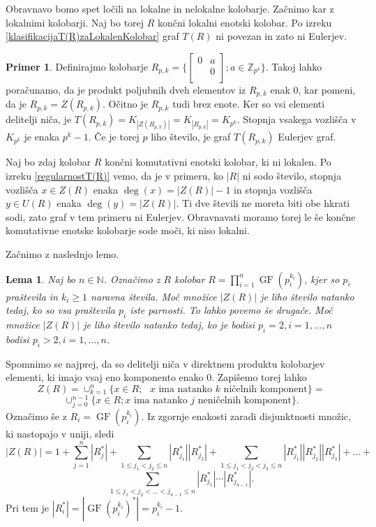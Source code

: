 \documentclass[a4paper, 12pt]{amsart}
\theoremstyle{definition} %
\newtheorem{primer}[definicija]{Primer}
\theoremstyle{plain} %
\newtheorem{lema}[definicija]{Lema}
\newcommand{\N}{\mathbb N}
\newcommand{\Z}{\mathbb Z}
\DeclareMathOperator{\GF}{GF}
\begin{document}
Obravnavo bomo spet ločili na lokalne in nelokalne kolobarje. Začnimo kar z lokalnimi kolobarji. Naj bo torej $R$ končni lokalni enotski kolobar. Po izreku  \ref{klasifikacijaT(R)zaLokalenKolobar} graf $T(R)$ ni povezan in zato ni Eulerjev. 

\begin{primer}
Definirajmo kolobarje $R_{p,k} = \big\{  
\begin{bmatrix}
0 & a \\
 & 0\\
\end{bmatrix};
a \in \Z_{p^k}
\big\}
$. 
Takoj lahko poračunamo, da je produkt poljubnih dveh elementov iz $R_{p,k}$ enak 0, kar pomeni, da je $R_{p,k} = Z(R_{p,k})$. Očitno je $R_{p,k}$ tudi brez enote. Ker so vsi elementi delitelji niča, je $T(R_{p,k}) = K_{|Z(R_{p,k})|} = K_{|R_{p,k}|} = K_{p^k}$. Stopnja vsakega vozlišča v $K_{p^k}$ je enaka $p^k -1$. Če je torej $p$ liho število, je graf $T(R_{p,k})$ Eulerjev graf.
\end{primer}

Naj bo zdaj kolobar $R$ končni komutativni enotski kolobar, ki ni lokalen. Po izreku  \ref{regularnostT(R)} vemo, da je v primeru, ko $|R|$ ni sodo število, stopnja vozlišča $x\in Z(R)$ enaka $\deg(x) = |Z(R)| -1$ in stopnja vozlišča $y\in U(R)$ enaka $\deg(y) = |Z(R)|$. Ti dve števili ne moreta biti obe hkrati sodi, zato graf v tem primeru ni Eulerjev.
Obravnavati moramo torej le še končne komutativne enotske kolobarje sode moči, ki niso lokalni. 

Začnimo z naslednjo lemo.

\begin{lema}
Naj bo $n\in \N$. Označimo z $R$ kolobar $R=\prod_{i=1}^n \GF(p_i^{k_i})$, kjer so $p_i$ praštevila in $k_i\ge 1$ naravna števila. Moč množice $|Z(R)|$ je liho število natanko tedaj, ko so vsa praštevila $p_i$ iste parnosti. To lahko povemo še drugače. Moč množice $|Z(R) |$ je liho število natanko tedaj, ko je bodisi $p_i =2, i=1,\dots,n$ bodisi $p_i > 2, i =1,\dots,n$.
\end{lema}

\proof
Spomnimo se najprej, da so delitelji niča v direktnem produktu kolobarjev elementi, ki imajo vsaj eno komponento enako 0. Zapišemo torej lahko 
$$
Z(R) = \cup_{k=1}^n \{x\in R; \text{ $x$ ima natanko $k$ ničelnih komponent}\}=
$$
$$
\cup_{j=0}^{n-1} \{ x\in R; \text{$x$ ima natanko $j$ neničelnih komponent} \}.
$$
Označimo še z $R_i = \GF(p_i^{k_i})$. Iz zgornje enakosti zaradi disjunktnosti množic, ki nastopajo v uniji, sledi 
$$|Z(R)| = 1+ \sum_{j=1}^n |R_j^*| + \sum_{1\le j_1 < j_2 \le n} |R_{j_1}^*| |R_{j_2}^*| +  \sum_{1\le j_1 < j_2<j_3 \le n} |R_{j_1}^*| |R_{j_2}^*| |R_{j_3}^*|  + \dots + 
$$
$$
 \sum_{1\le j_1 < j_2 <\dots< j_{n-1}\le n} |R_{j_1}^*|\cdots  |R_{j_{n-1}}^*|. 
$$
Pri tem je $|R_i^*| = |\GF(p_i^{k_i})^*| = p_i^{k_i} - 1$. 
\end{document}
